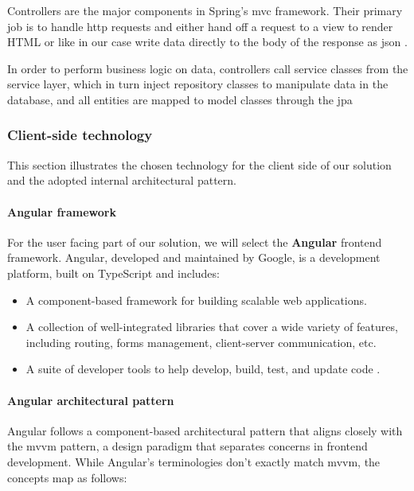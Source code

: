 Controllers are the major components in Spring’s \acrshort{mvc} framework. Their primary job is to handle
\acrshort{http} requests and either hand off a request to a view to render HTML or like in our case
write data directly to the body of the response as \acrshort{json} \cite{spring-in-action}.

In order to perform business logic on data, controllers call service classes from the service layer,
which in turn inject repository classes to manipulate data in the database, and all entities are mapped
to model classes through the \acrfull{jpa}


\subsubsection{Client-side technology}
\label{cst}
This section illustrates the chosen technology for the client side of our solution and the adopted
internal architectural pattern.

\paragraph{Angular framework} \mbox{} \newline \newline
For the user facing part of our solution, we will select the \textbf{Angular} frontend framework.
Angular, developed and maintained by Google, is a development platform, built on TypeScript and
includes:
\begin{itemize}
      \item A component-based framework for building scalable web applications.
      \item A collection of well-integrated libraries that cover a wide variety of features,
            including routing, forms management, client-server communication, etc.
      \item A suite of developer tools to help develop, build, test, and update code \cite{angular}. \\
\end{itemize}


\paragraph{Angular architectural pattern} \mbox{} \newline \newline
Angular follows a component-based architectural pattern that aligns closely with the
\acrfull{mvvm} pattern, a design paradigm that separates concerns in frontend
development. While Angular's terminologies don't exactly match \acrshort{mvvm},
the concepts map as follows: \\

